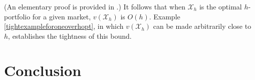 \noindent (An elementary proof is provided in \cite{kapur2022}.) It follows that when $\mathcal{X}_h$ is the optimal $h$-portfolio for a given market, $v(\mathcal{X}_h)$ is $O(h)$. Example \ref{tightexampleforoneoverhopt}, in which $v(\mathcal{X}_h)$ can be made arbitrarily close to $h$, establishes the tightness of this bound.






\section{Conclusion} \label{sectionConclusion}


